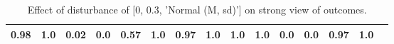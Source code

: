\begin{table}
\begin{tabular}{l|cc|cc|cc|cc|cc|cc|cc}
\cellcolor{Bittersweet}0.98&\cellcolor{Bittersweet}1.0&\cellcolor{Bittersweet}0.02&\cellcolor{Bittersweet}0.0&\cellcolor{Bittersweet}0.57&\cellcolor{Bittersweet}1.0&\cellcolor{Bittersweet}0.97&\cellcolor{Bittersweet}1.0&\cellcolor{Bittersweet}1.0&\cellcolor{Bittersweet}1.0&\cellcolor{Bittersweet}0.0&\cellcolor{Bittersweet}0.0&\cellcolor{Bittersweet}0.97&\cellcolor{Bittersweet}1.0\\\bottomrule\end{tabular}\caption{Effect of disturbance of [0, 0.3, 'Normal (M, sd)'] on strong view of outcomes.}\end{table}